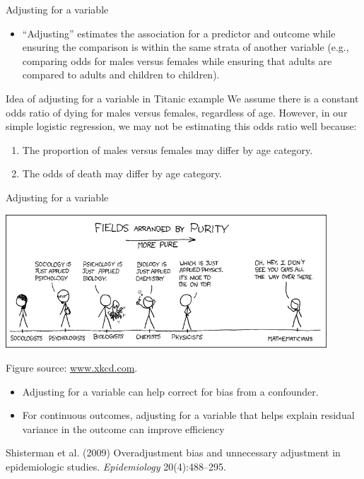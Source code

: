 \documentclass[ignorenonframetext,]{beamer}
\providecommand{\tightlist}{%
  \setlength{\itemsep}{0pt}\setlength{\parskip}{0pt}}
\begin{document}
\begin{frame}{Adjusting for a variable}

\begin{itemize}
\tightlist
\item
  ``Adjusting'' estimates the association for a predictor and outcome
  while ensuring the comparison is within the same strata of another
  variable (e.g., comparing odds for males versus females while ensuring
  that adults are compared to adults and children to children).
\end{itemize}

\begin{block}{Idea of adjusting for a variable in Titanic example}
We assume there is a constant odds ratio of dying for males versus females, regardless of age. However, in our simple logistic regression, we may not be estimating this odds ratio well because: 
\begin{enumerate}
  \item The proportion of males versus females may differ by age category.
  \item The odds of death may differ by age category.
\end{enumerate}
\end{block}

\end{frame}

\begin{frame}{Adjusting for a variable}

\begin{center}\includegraphics[width=0.9\textwidth]{images/purity} \end{center}

\vspace{-8mm}

\footnotesize{Figure source: \url{www.xkcd.com}.}

\small

\begin{itemize}
\tightlist
\item
  Adjusting for a variable can help correct for bias from a confounder.
\item
  For continuous outcomes, adjusting for a variable that helps explain
  residual variance in the outcome can improve efficiency
\end{itemize}

\footnotesize{Shisterman et al. (2009) Overadjustment bias and unnecessary adjustment in epidemiologic studies. \textit{Epidemiology} 20(4):488--295.}

\end{frame}
\end{document}
